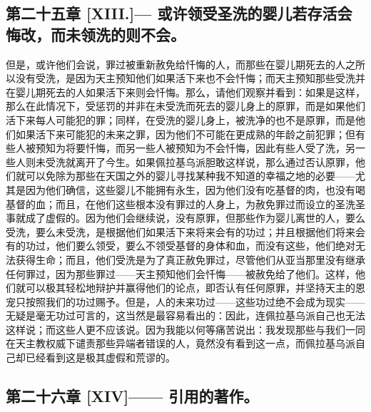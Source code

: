 \subsection{第二十五章 [XIII.]— 或许领受圣洗的婴儿若存活会悔改，而未领洗的则不会。}

但是，或许他们会说，罪过被重新赦免给忏悔的人，而那些在婴儿期死去的人之所以没有受洗，是因为天主预知他们如果活下来也不会忏悔；而天主预知那些受洗并在婴儿期死去的人如果活下来则会忏悔。那么，请他们观察并看到：如果是这样，那么在此情况下，受惩罚的并非在未受洗而死去的婴儿身上的原罪，而是如果他们活下来每人可能犯的罪；同样，在受洗的婴儿身上，被洗净的也不是原罪，而是他们如果活下来可能犯的未来之罪，因为他们不可能在更成熟的年龄之前犯罪；但有些人被预知为将要忏悔，而另一些人被预知为不会忏悔，因此有些人受了洗，另一些人则未受洗就离开了今生。如果佩拉基乌派胆敢这样说，那么通过否认原罪，他们就可以免除为那些在天国之外的婴儿寻找某种我不知道的幸福之地的必要——尤其是因为他们确信，这些婴儿不能拥有永生，因为他们没有吃基督的肉，也没有喝基督的血；而且，在他们这些根本没有罪过的人身上，为赦免罪过而设立的圣洗圣事就成了虚假的。因为他们会继续说，没有原罪，但那些作为婴儿离世的人，要么受洗，要么未受洗，是根据他们如果活下来将来会有的功过；并且根据他们将来会有的功过，他们要么领受，要么不领受基督的身体和血，而没有这些，他们绝对无法获得生命；而且，他们受洗是为了真正赦免罪过，尽管他们从亚当那里没有继承任何罪过，因为那些罪过——天主预知他们会忏悔——被赦免给了他们。这样，他们就可以极其轻松地辩护并赢得他们的论点，即否认有任何原罪，并坚持天主的恩宠只按照我们的功过赐予。但是，人的未来功过——这些功过绝不会成为现实——无疑是毫无功过可言的，这当然是最容易看出的：因此，连佩拉基乌派自己也无法这样说；而这些人更不应该说。因为我能以何等痛苦说出：我发现那些与我们一同在天主教权威下谴责那些异端者错误的人，竟然没有看到这一点，而佩拉基乌派自己却已经看到这是极其虚假和荒谬的。\par


\subsection{第二十六章 [XIV]—— 引用的著作。}

